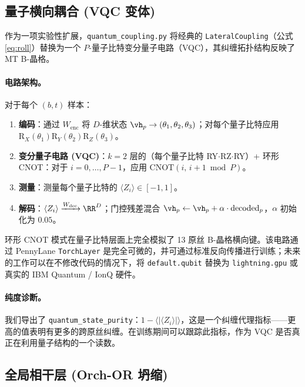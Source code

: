 \subsection{量子横向耦合 (VQC 变体)}
\label{sec:quantum}

作为一项实验性扩展，\texttt{quantum\_coupling.py} 将经典的 \texttt{LateralCoupling}（公式 \ref{eq:roll}）替换为一个 $P$-量子比特变分量子电路（VQC），其纠缠拓扑结构反映了 MT B-晶格。

\paragraph{电路架构。}
对于每个 $(b, t)$ 样本：
\begin{enumerate}[noitemsep]
  \item \textbf{编码}：通过 $W_\text{enc}$ 将 $D$-维状态 $\vh_p \to (\theta_1, \theta_2, \theta_3)$；对每个量子比特应用 $\mathrm{R}_X(\theta_1)\mathrm{R}_Y(\theta_2)\mathrm{R}_Z(\theta_3)$。
  \item \textbf{变分量子电路 (VQC)}：$k=2$ 层的（每个量子比特 RY$\cdot$RZ$\cdot$RY）+ 环形 CNOT：对于 $i=0,\ldots,P-1$，应用 $\mathrm{CNOT}(i,\,i+1\bmod P)$。
  \item \textbf{测量}：测量每个量子比特的 $\langle Z_i\rangle\in[-1,1]$。
  \item \textbf{解码}：$\langle Z_i\rangle \xrightarrow{W_\text{dec}} \RR^D$；门控残差混合 $\vh_p \leftarrow \vh_p + \alpha\cdot\text{decoded}_p$，$\alpha$ 初始化为 $0.05$。
\end{enumerate}
环形 CNOT 模式在量子比特层面上完全模拟了 13 原丝 B-晶格横向键。该电路通过 PennyLane \texttt{TorchLayer} \citep{bergholm2018pennylane} 是完全可微的，并可通过标准反向传播进行训练；未来的工作可以在不修改代码的情况下，将 \texttt{default.qubit} 替换为 \texttt{lightning.gpu} 或真实的 IBM Quantum / IonQ 硬件。

\paragraph{纯度诊断。}
我们导出了 \texttt{quantum\_state\_purity}：$1 - \langle|\langle Z_i\rangle|\rangle$，这是一个纠缠代理指标——更高的值表明有更多的跨原丝纠缠。在训练期间可以跟踪此指标，作为 VQC 是否真正在利用量子结构的一个读数。

\subsection{全局相干层 (Orch-OR 坍缩)}
\label{sec:coherence}

